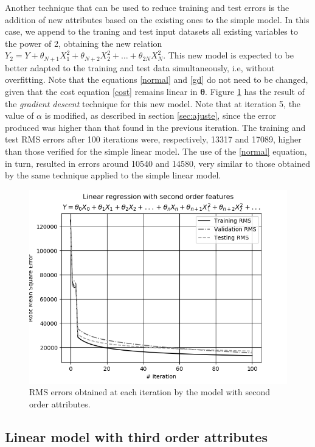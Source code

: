 \documentclass[10pt,twocolumn,letterpaper]{article}
\begin{document}
Another technique that can be used to reduce training and test errors is the addition of new attributes based on the existing ones to the simple model. In this case, we append to the traning and test input datasets all existing variables to the power of 2, obtaining the new relation \(Y_2 = Y + \theta_{N + 1}X_1 ^ 2 + \theta_{N + 2}X_2 ^ 2 + \ldots + \theta_{2N}X_N^2\). This new model is expected to be better adapted to the training and test data simultaneously, i.e, without overfitting. Note that the equations \ref{normal} and \ref{gd} do not need to be changed, given that the cost equation \ref {cost} remains linear in \(\bm{\theta}\). Figure \ref{fig:gd-second} has the result of the \textit {gradient descent} technique for this new model. Note that at iteration 5, the value of \(\alpha\) is modified, as described in section \ref{sec:ajuste}, since the error produced was higher than that found in the previous iteration. The training and test RMS errors after 100 iterations were, respectively, 13317 and 17089, higher than those verified for the simple linear model. The use of the \ref{normal} equation, in turn, resulted in errors around 10540 and 14580, very similar to those obtained by the same technique applied to the simple linear model.

\begin{figure}
    \centering
    \includegraphics[width=0.9\columnwidth]{img/lr-second-gd.png}
    \caption{RMS errors obtained at each iteration by the model with second order attributes.}
    \label{fig:gd-second}
\end{figure}

\subsection{Linear model with third order attributes}
\end{document}
